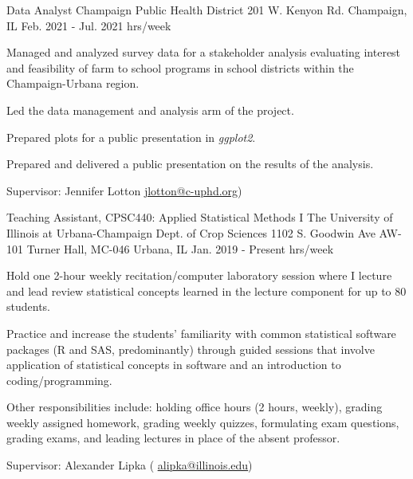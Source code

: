 \begin{cventries}
  \cventry
    {Data Analyst}%
    {Champaign Public Health District } %
    {201 W. Kenyon Rd. \newline
    Champaign, IL} %
    {Feb. 2021 - Jul. 2021  hrs/week} %
    {
      \begin{cvitems} %
        \item {Managed and analyzed survey data for a stakeholder analysis evaluating interest and feasibility of farm to school programs in school districts within the Champaign-Urbana region.}
        \item{Led the data management and analysis arm of the project.}
        \item{Prepared plots for a public presentation in \textit{ggplot2}.}
        \item{Prepared and delivered a public presentation on the results of the analysis.}
        \item {Supervisor: Jennifer Lotton \textcolor{navyblue}{\underline{\href{mailto:jlotton@c-uphd.org}{jlotton@c-uphd.org}}})}
      \end{cvitems}
    }



  \cventry
    {Teaching Assistant, CPSC440: Applied Statistical Methods I} %
    {The University of Illinois at Urbana-Champaign \newline Dept. of Crop Sciences } %
    {1102 S. Goodwin Ave \newline AW-101 Turner Hall, MC-046 \newline
    Urbana, IL} %
    {Jan. 2019 - Present  hrs/week} %
    {
      \begin{cvitems} %
        \item {Hold one 2-hour weekly recitation/computer laboratory session where I lecture and lead review statistical concepts learned in the lecture component for up to 80 students.}
        \item {Practice and increase the students’ familiarity with common statistical software packages (R and SAS, predominantly) through guided sessions that involve application of statistical concepts in software and an introduction to coding/programming.}
        \item {Other responsibilities include: holding office hours (2 hours, weekly), grading weekly assigned homework, grading weekly quizzes, formulating exam questions, grading exams, and leading lectures in place of the absent professor.}
        \item {Supervisor: Alexander Lipka ( \textcolor{navyblue}{\underline{\href{mailto:alipka@illinois.edu}{alipka@illinois.edu}}})}
      \end{cvitems}
    }




\end{cventries}
